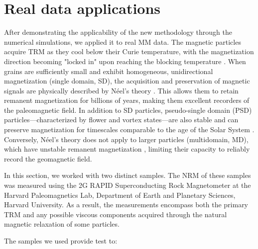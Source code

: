 \documentclass[onecolumn,12pt,a4paper]{article}
\begin{document}
\section{Real data applications}

After demonstrating the applicability of the new methodology through the numerical simulations, we applied it to real MM data. The magnetic particles \citep[most commonly magnetite,][]{OReilly1984} acquire TRM as they cool below their Curie temperature, with the magnetization direction becoming "locked in" upon reaching the blocking temperature \citep{Dunlop1997}. When grains are sufficiently small and exhibit homogeneous, unidirectional magnetization (single domain, SD), the acquisition and preservation of magnetic signals are physically described by Néel’s theory \citep{Neel1949, Neel1955}. This allows them to retain remanent magnetization for billions of years, making them excellent recorders of the paleomagnetic field. In addition to SD particles, pseudo-single domain (PSD) particles—characterized by flower and vortex states—are also stable and can preserve magnetization for timescales comparable to the age of the Solar System \citep{Nagy2017, Lascu2018,Bellon-2024a}. Conversely, Néel’s theory does not apply to larger particles (multidomain, MD), which have unstable remanent magnetization \citep[e.g., due to viscous domain reorganization,][]{DeGroot2014}, limiting their capacity to reliably record the geomagnetic field. 

In this section, we worked with two distinct samples. The NRM of these samples was measured using the 2G RAPID Superconducting Rock Magnetometer at the Harvard Paleomagnetics Lab, Department of Earth and Planetary Sciences, Harvard University. As a result, the measurements encompass both the primary TRM and any possible viscous components acquired through the natural magnetic relaxation of some particles. 

The samples we used provide test to:
\end{document}
